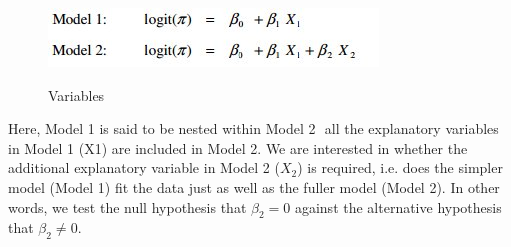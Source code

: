 \documentclass[a4paper,12pt]{article}
\begin{document}
\begin{center}
	\begin{figure}[h!]
		\includegraphics[scale=0.6]{images/LogWeek10D}\\
		\caption{Variables}
	\end{figure}
\end{center}
Here, Model 1 is said to be nested within Model 2  all the explanatory variables in Model 1
(X1) are included in Model 2. We are interested in whether the additional explanatory
variable in Model 2 ($X_2$) is required, i.e. does the simpler model (Model 1) fit the data just as
well as the fuller model (Model 2). In other words, we test the null hypothesis that $\beta_2 = 0$
against the alternative hypothesis that $\beta_2 \neq 0$. 
\end{document}
